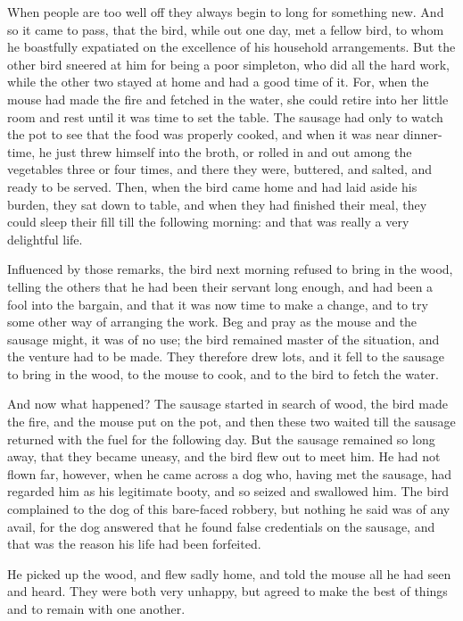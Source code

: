 \documentclass[12pt]{book}
\begin{document}
When people are too well off they always begin to long for something
new. And so it came to pass, that the bird, while out one day, met a
fellow bird, to whom he boastfully expatiated on the excellence of his
household arrangements. But the other bird sneered at him for being a
poor simpleton, who did all the hard work, while the other two stayed
at home and had a good time of it. For, when the mouse had made the
fire and fetched in the water, she could retire into her little room
and rest until it was time to set the table. The sausage had only to
watch the pot to see that the food was properly cooked, and when it
was near dinner-time, he just threw himself into the broth, or rolled
in and out among the vegetables three or four times, and there they
were, buttered, and salted, and ready to be served. Then, when the
bird came home and had laid aside his burden, they sat down to table,
and when they had finished their meal, they could sleep their fill
till the following morning: and that was really a very delightful
life.

Influenced by those remarks, the bird next morning refused to bring in
the wood, telling the others that he had been their servant long
enough, and had been a fool into the bargain, and that it was now time
to make a change, and to try some other way of arranging the work. Beg
and pray as the mouse and the sausage might, it was of no use; the
bird remained master of the situation, and the venture had to be made.
They therefore drew lots, and it fell to the sausage to bring in the
wood, to the mouse to cook, and to the bird to fetch the water.

And now what happened? The sausage started in search of wood, the bird
made the fire, and the mouse put on the pot, and then these two waited
till the sausage returned with the fuel for the following day. But the
sausage remained so long away, that they became uneasy, and the bird
flew out to meet him. He had not flown far, however, when he came
across a dog who, having met the sausage, had regarded him as his
legitimate booty, and so seized and swallowed him. The bird complained
to the dog of this bare-faced robbery, but nothing he said was of any
avail, for the dog answered that he found false credentials on the
sausage, and that was the reason his life had been forfeited.

He picked up the wood, and flew sadly home, and told the mouse all he
had seen and heard. They were both very unhappy, but agreed to make
the best of things and to remain with one another.
\end{document}

